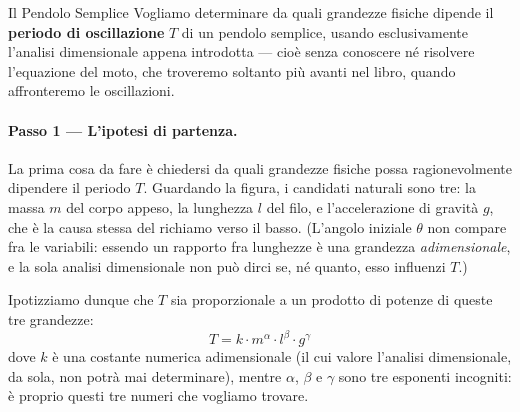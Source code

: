 \begin{esercizio}{Il Pendolo Semplice}
Vogliamo determinare da quali grandezze fisiche dipende il \textbf{periodo di oscillazione} $T$ di un pendolo semplice, usando esclusivamente l'analisi dimensionale appena introdotta — cioè senza conoscere né risolvere l'equazione del moto, che troveremo soltanto più avanti nel libro, quando affronteremo le oscillazioni.

    \begin{center}
    \end{center}

\paragraph{Passo 1 --- L'ipotesi di partenza.}
La prima cosa da fare è chiedersi da quali grandezze fisiche possa ragionevolmente dipendere il periodo $T$. Guardando la figura, i candidati naturali sono tre: la massa $m$ del corpo appeso, la lunghezza $l$ del filo, e l'accelerazione di gravità $g$, che è la causa stessa del richiamo verso il basso. (L'angolo iniziale $\theta$ non compare fra le variabili: essendo un rapporto fra lunghezze è una grandezza \emph{adimensionale}, e la sola analisi dimensionale non può dirci se, né quanto, esso influenzi $T$.)

Ipotizziamo dunque che $T$ sia proporzionale a un prodotto di potenze di queste tre grandezze:
\begin{equation}
    T = k \cdot m^\alpha \cdot l^\beta \cdot g^\gamma
\end{equation}
dove $k$ è una costante numerica adimensionale (il cui valore l'analisi dimensionale, da sola, non potrà mai determinare), mentre $\alpha$, $\beta$ e $\gamma$ sono tre esponenti incogniti: è proprio questi tre numeri che vogliamo trovare.


\end{esercizio}
